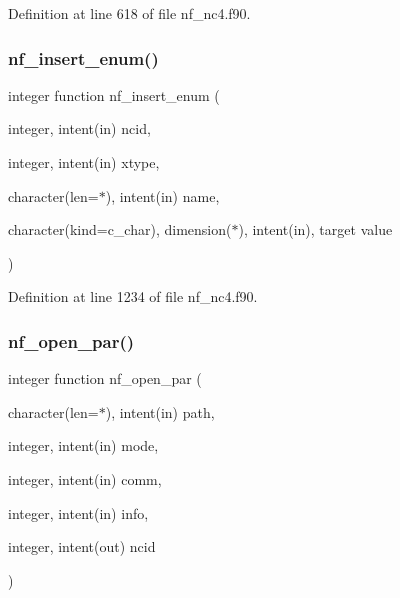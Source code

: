 Definition at line 618 of file nf\+\_\+nc4.\+f90.

\mbox{\label{nf__nc4_8f90_aff430fba54005f12cce6001f6bee168e}} 
\subsubsection{\texorpdfstring{nf\+\_\+insert\+\_\+enum()}{nf\_insert\_enum()}}
{\footnotesize\ttfamily integer function nf\+\_\+insert\+\_\+enum (\begin{DoxyParamCaption}\item[{integer, intent(in)}]{ncid,  }\item[{integer, intent(in)}]{xtype,  }\item[{character(len=$\ast$), intent(in)}]{name,  }\item[{character(kind=c\+\_\+char), dimension($\ast$), intent(in), target}]{value }\end{DoxyParamCaption})}



Definition at line 1234 of file nf\+\_\+nc4.\+f90.

\mbox{\label{nf__nc4_8f90_ab7b8fd403c3781b74a8c4a7cbfe1458f}} 
\subsubsection{\texorpdfstring{nf\+\_\+open\+\_\+par()}{nf\_open\_par()}}
{\footnotesize\ttfamily integer function nf\+\_\+open\+\_\+par (\begin{DoxyParamCaption}\item[{character(len=$\ast$), intent(in)}]{path,  }\item[{integer, intent(in)}]{mode,  }\item[{integer, intent(in)}]{comm,  }\item[{integer, intent(in)}]{info,  }\item[{integer, intent(out)}]{ncid }\end{DoxyParamCaption})}



